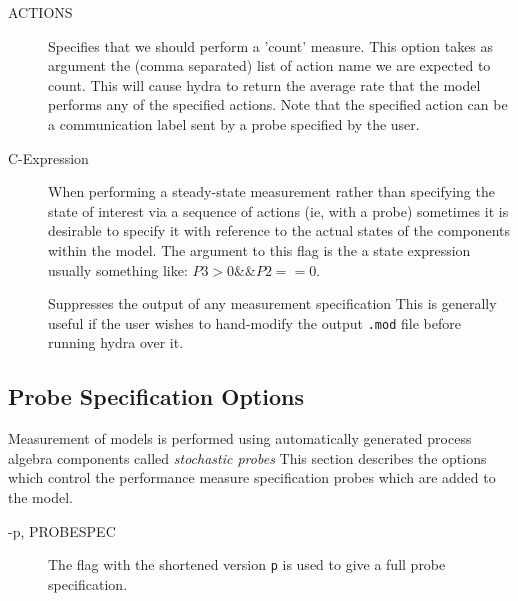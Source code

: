 \begin{description}
\item[ ACTIONS]
Specifies that we should perform a 'count' measure.
This option takes as argument the (comma separated) list of
action name we are expected to count.
This will cause hydra to return the average rate that the model
performs any of the specified actions.
Note that the specified action can be a communication label sent
by a probe specified by the user.

\end{description}

\begin{description}
\item[ C-Expression]
When performing a steady-state measurement rather than
specifying the state of interest via a sequence of
actions (ie, with a probe) sometimes it is desirable to
specify it with reference to the actual states of the
components within the model. The argument to this flag
is the a state expression usually something like: 
$P3 > 0 \&\& P2 == 0$.

\end{description}

\begin{description}
\item[ ]
Suppresses the output of any measurement specification
This is generally useful if the user wishes to hand-modify
the output \texttt{.mod} file before running hydra over it.

\end{description}


\subsection{Probe Specification Options}
Measurement of models is performed using automatically
generated process algebra components called
\emph{stochastic probes}
This section describes the options which control
the performance measure specification probes which
are added to the model.

\begin{description}
\item[-p,  PROBESPEC]
The flag  with the shortened version
\texttt{p} is used to give a full probe specification.

\end{description}

